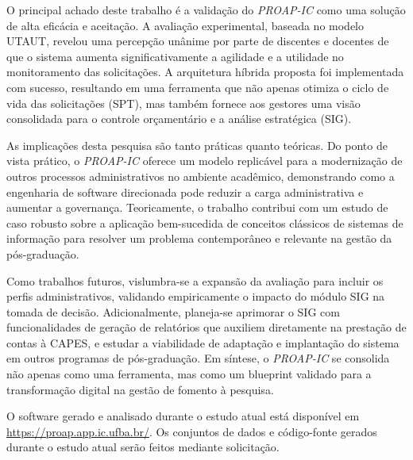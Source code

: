 \documentclass[portuguese]{sbc2025}%
\begin{document}
O principal achado deste trabalho é a validação do \textit{PROAP-IC} como uma solução de alta eficácia e aceitação. A avaliação experimental, baseada no modelo UTAUT, revelou uma percepção unânime por parte de discentes e docentes de que o sistema aumenta significativamente a agilidade e a utilidade no monitoramento das solicitações. A arquitetura híbrida proposta foi implementada com sucesso, resultando em uma ferramenta que não apenas otimiza o ciclo de vida das solicitações (SPT), mas também fornece aos gestores uma visão consolidada para o controle orçamentário e a análise estratégica (SIG).

As implicações desta pesquisa são tanto práticas quanto teóricas. Do ponto de vista prático, o \textit{PROAP-IC} oferece um modelo replicável para a modernização de outros processos administrativos no ambiente acadêmico, demonstrando como a engenharia de software direcionada pode reduzir a carga administrativa e aumentar a governança. Teoricamente, o trabalho contribui com um estudo de caso robusto sobre a aplicação bem-sucedida de conceitos clássicos de sistemas de informação para resolver um problema contemporâneo e relevante na gestão da pós-graduação.

Como trabalhos futuros, vislumbra-se a expansão da avaliação para incluir os perfis administrativos, validando empiricamente o impacto do módulo SIG na tomada de decisão. Adicionalmente, planeja-se aprimorar o SIG com funcionalidades de geração de relatórios que auxiliem diretamente na prestação de contas à CAPES, e estudar a viabilidade de adaptação e implantação do sistema em outros programas de pós-graduação. Em síntese, o \textit{PROAP-IC} se consolida não apenas como uma ferramenta, mas como um blueprint validado para a transformação digital na gestão de fomento à pesquisa.



\begin{declarations}




\begin{materials}
O software gerado e analisado durante o estudo atual está
  disponível em \href{https://proap.app.ic.ufba.br/}{https://proap.app.ic.ufba.br/}. Os conjuntos de dados e código-fonte gerados durante o estudo atual serão
  feitos mediante solicitação.
\end{materials}

\end{declarations}





\end{document}
